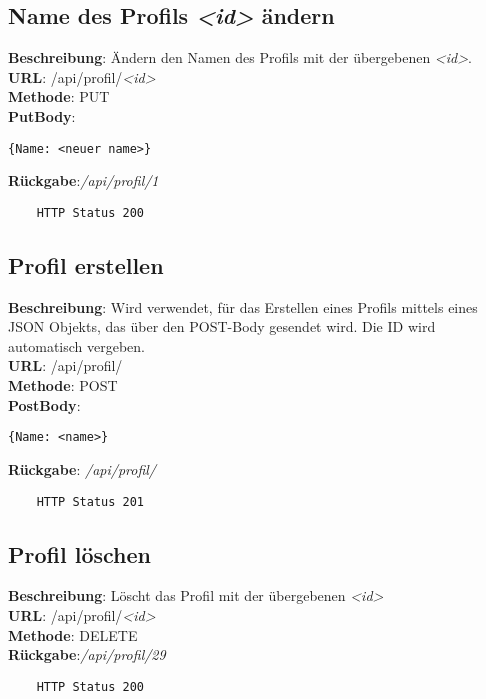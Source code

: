 \documentclass[11pt,a4paper]{article} %
\begin{document}
\subsection*{Name des Profils \textit{<id>} ändern}
\textbf{Beschreibung}: Ändern den Namen des Profils mit der übergebenen \textit{<id>}.\\
\textbf{URL}: /api/profil/\textit{<id>}\\
\textbf{Methode}: PUT\\
\textbf{PutBody}: 
\begin{lstlisting}
{Name: <neuer name>}
\end{lstlisting}
\textbf{Rückgabe}:\textcolor{kommi}{\textit{/api/profil/1}}\\
\begin{lstlisting}
	HTTP Status 200
\end{lstlisting}

\subsection*{Profil erstellen}
\textbf{Beschreibung}: Wird verwendet, für das Erstellen eines Profils mittels eines JSON Objekts, das über den POST-Body gesendet wird. Die ID wird automatisch vergeben.\\
\textbf{URL}: /api/profil/\\
\textbf{Methode}: POST\\
\textbf{PostBody}: 
\begin{lstlisting}
{Name: <name>}
\end{lstlisting}
\textbf{Rückgabe}: \textcolor{kommi}{\textit{/api/profil/}}\\
\begin{lstlisting}
	HTTP Status 201
\end{lstlisting}

\subsection*{Profil löschen}
\textbf{Beschreibung}: Löscht das Profil mit der übergebenen \textit{<id>}\\
\textbf{URL}: /api/profil/\textit{<id>}\\
\textbf{Methode}: DELETE\\
\textbf{Rückgabe}:\textcolor{kommi}{\textit{/api/profil/29}}\\
\begin{lstlisting}
	HTTP Status 200
\end{lstlisting}
\end{document}
